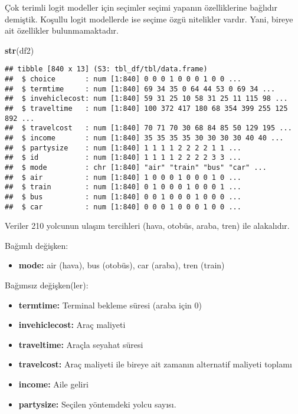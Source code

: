 \documentclass[
]{book}
\newenvironment{Shaded}{\begin{snugshade}}{\end{snugshade}}
\newcommand{\KeywordTok}[1]{\textcolor[rgb]{0.13,0.29,0.53}{\textbf{#1}}}
\newcommand{\NormalTok}[1]{#1}
\providecommand{\tightlist}{%
  \setlength{\itemsep}{0pt}\setlength{\parskip}{0pt}}
\begin{document}
Çok terimli logit modeller için seçimler seçimi yapanın özelliklerine bağlıdır demiştik. Koşullu logit modellerde ise seçime özgü nitelikler vardır. Yani, bireye ait özellikler bulunmamaktadır.

\begin{Shaded}
\begin{Highlighting}[]
\KeywordTok{str}\NormalTok{(df2)}
\end{Highlighting}
\end{Shaded}

\begin{verbatim}
## tibble [840 x 13] (S3: tbl_df/tbl/data.frame)
##  $ choice       : num [1:840] 0 0 0 1 0 0 0 1 0 0 ...
##  $ termtime     : num [1:840] 69 34 35 0 64 44 53 0 69 34 ...
##  $ invehiclecost: num [1:840] 59 31 25 10 58 31 25 11 115 98 ...
##  $ traveltime   : num [1:840] 100 372 417 180 68 354 399 255 125 892 ...
##  $ travelcost   : num [1:840] 70 71 70 30 68 84 85 50 129 195 ...
##  $ income       : num [1:840] 35 35 35 35 30 30 30 30 40 40 ...
##  $ partysize    : num [1:840] 1 1 1 1 2 2 2 2 1 1 ...
##  $ id           : num [1:840] 1 1 1 1 2 2 2 2 3 3 ...
##  $ mode         : chr [1:840] "air" "train" "bus" "car" ...
##  $ air          : num [1:840] 1 0 0 0 1 0 0 0 1 0 ...
##  $ train        : num [1:840] 0 1 0 0 0 1 0 0 0 1 ...
##  $ bus          : num [1:840] 0 0 1 0 0 0 1 0 0 0 ...
##  $ car          : num [1:840] 0 0 0 1 0 0 0 1 0 0 ...
\end{verbatim}

Veriler 210 yolcunun ulaşım tercihleri (hava, otobüs, araba, tren) ile alakalıdır.

Bağımlı değişken:

\begin{itemize}
\tightlist
\item
  \textbf{mode:} air (hava), bus (otobüs), car (araba), tren (train)
\end{itemize}

Bağımsız değişken(ler):

\begin{itemize}
\item
  \textbf{termtime:} Terminal bekleme süresi (araba için 0)
\item
  \textbf{invehiclecost:} Araç maliyeti
\item
  \textbf{traveltime:} Araçla seyahat süresi
\item
  \textbf{travelcost:} Araç maliyeti ile bireye ait zamanın alternatif maliyeti toplamı
\item
  \textbf{income:} Aile geliri
\item
  \textbf{partysize:} Seçilen yöntemdeki yolcu sayısı.
\end{itemize}
\end{document}
